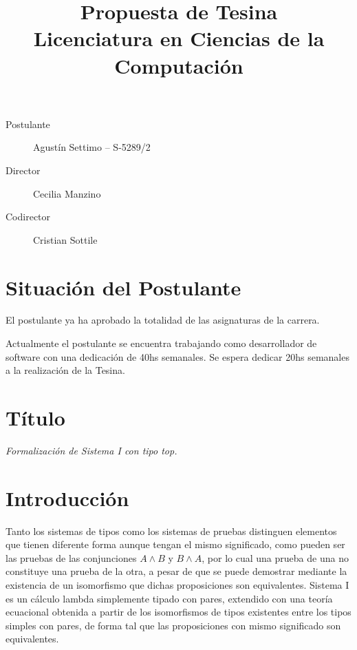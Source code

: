 \documentclass[a4paper,10pt]{article}
\title{Propuesta de Tesina \\ Licenciatura en Ciencias de la Computación}
\author{}
\begin{document}
\maketitle

\begin{description}
 \item[Postulante] Agustín Settimo -- S-5289/2
 \item[Director] Cecilia Manzino
 \item[Codirector] Cristian Sottile
\end{description}

\section{Situación del Postulante}

El postulante ya ha aprobado la totalidad de las asignaturas de la carrera.

Actualmente el postulante se encuentra trabajando como desarrollador de software con una dedicación de 40hs semanales. Se espera dedicar 20hs semanales a la realización de la Tesina.

\section{Título}

\textit{Formalización de Sistema I con tipo top.}

\section{Introducción}

Tanto los sistemas de tipos como los sistemas de pruebas distinguen elementos que tienen diferente forma aunque tengan el mismo significado, como pueden ser las pruebas de las conjunciones $A \wedge B$ y $B \wedge A$, por lo cual una prueba de una no constituye una prueba de la otra, a pesar de que se puede demostrar mediante la existencia de un isomorfismo que dichas proposiciones son equivalentes. Sistema I es un cálculo lambda simplemente tipado con pares, extendido con una teoría ecuacional obtenida a partir de los isomorfismos de tipos existentes entre los tipos simples con pares, de forma tal que las proposiciones con mismo significado son equivalentes.
\end{document}
